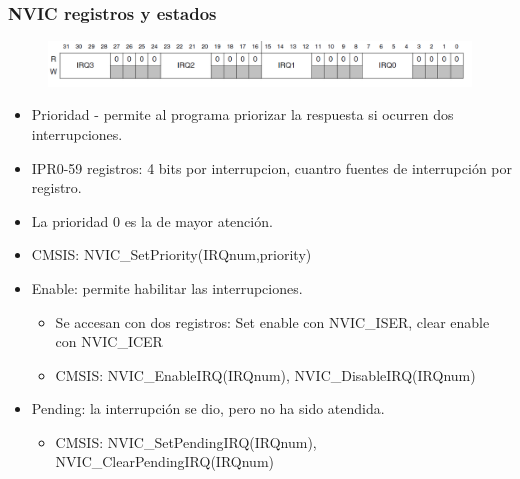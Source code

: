 \documentclass[10.5pt,scale=1.0,t,aspectratio=169,hyperref={pdfpagelabels=false}]{beamer}
\begin{document}
\begin{frame}
	\frametitle{NVIC registros y estados}
	\begin{figure}
		\centering
		\includegraphics[scale=0.6]{05_IPR0}
	\end{figure}
	\begin{itemize}
		\item Prioridad - permite al programa priorizar la respuesta si ocurren dos interrupciones. 
		\item IPR0-59 registros: 4 bits por interrupcion, cuantro fuentes de interrupción por registro. 
		\item La prioridad 0 es la de mayor atención. 
		\item CMSIS: NVIC\_SetPriority(IRQnum,priority)
		\item Enable: permite habilitar las interrupciones.
		\begin{itemize}
			\item Se accesan con dos registros: Set enable con NVIC\_ISER, clear enable con NVIC\_ICER
			\item CMSIS: NVIC\_EnableIRQ(IRQnum), NVIC\_DisableIRQ(IRQnum)
		\end{itemize}
		\item Pending: la interrupción se dio, pero no ha sido atendida.
		\begin{itemize}
			\item CMSIS:  NVIC\_SetPendingIRQ(IRQnum), NVIC\_ClearPendingIRQ(IRQnum)
		\end{itemize}
	\end{itemize}
\end{frame}
\end{document}
